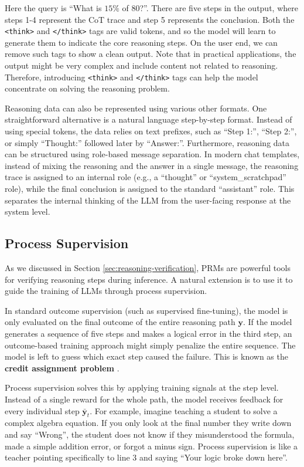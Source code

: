 Here the query is ``What is $15\%$ of $80$?''. There are five steps in the output, where steps 1-4 represent the CoT trace and step 5 represents the conclusion. Both the \texttt{<think>} and \texttt{</think>} tags are valid tokens, and so the model will learn to generate them to indicate the core reasoning steps. On the user end, we can remove such tags to show a clean output. Note that in practical applications, the output might be very complex and include content not related to reasoning. Therefore, introducing \texttt{<think>} and \texttt{</think>} tags can help the model concentrate on solving the reasoning problem.

Reasoning data can also be represented using various other formats. One straightforward alternative is a natural language step-by-step format. Instead of using special tokens, the data relies on text prefixes, such as ``Step 1:'', ``Step 2:'', or simply ``Thought:'' followed later by ``Answer:''. Furthermore, reasoning data can be structured using role-based message separation. In modern chat templates, instead of mixing the reasoning and the answer in a single message, the reasoning trace is assigned to an internal role (e.g., a ``thought'' or ``system\_scratchpad'' role), while the final conclusion is assigned to the standard ``assistant'' role. This separates the internal thinking of the LLM from the user-facing response at the system level.

\subsection{Process Supervision}

As we discussed in Section \ref{sec:reasoning-verification}, PRMs are powerful tools for verifying reasoning steps during inference. A natural extension is to use it to guide the training of LLMs through process supervision.

In standard outcome supervision (such as supervised fine-tuning), the model is only evaluated on the final outcome of the entire reasoning path $\mathbf{y}$. If the model generates a sequence of five steps and makes a logical error in the third step, an outcome-based training approach might simply penalize the entire sequence. The model is left to guess which exact step caused the failure. This is known as the \textbf{credit assignment problem} \cite{minsky:1961steps,sutton:1984temporal}.

Process supervision solves this by applying training signals at the step level. Instead of a single reward for the whole path, the model receives feedback for every individual step $\bar{\mathbf{y}}_t$. For example, imagine teaching a student to solve a complex algebra equation. If you only look at the final number they write down and say ``Wrong'', the student does not know if they misunderstood the formula, made a simple addition error, or forgot a minus sign. Process supervision is like a teacher pointing specifically to line 3 and saying ``Your logic broke down here''.

